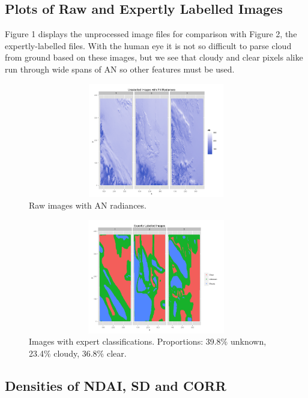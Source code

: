 \documentclass{article}\usepackage[]{graphicx}\usepackage[]{color}
\begin{document}
\subsection{Plots of Raw and Expertly Labelled Images}
Figure 1 displays the unprocessed image files for comparison with Figure 2, the expertly-labelled files. With the human eye it is not so difficult to parse cloud from ground based on these images, but we see that cloudy and clear pixels alike run through wide spans of AN so other features must be used.
\begin{figure}[]
\includegraphics[width = 18cm, height=5cm]{RAWEDA.png}
\caption{Raw images with AN radiances.}
\end{figure}

\begin{figure}[]
\includegraphics[width = 18cm, height=5cm]{EXPERTSEDA.png}
\caption{Images with expert classifications. Proportions: 39.8$\%$ unknown, 23.4$\%$ cloudy, 36.8$\%$ clear.}
\end{figure}
\subsection{Densities of NDAI, SD and CORR}
\end{document}
